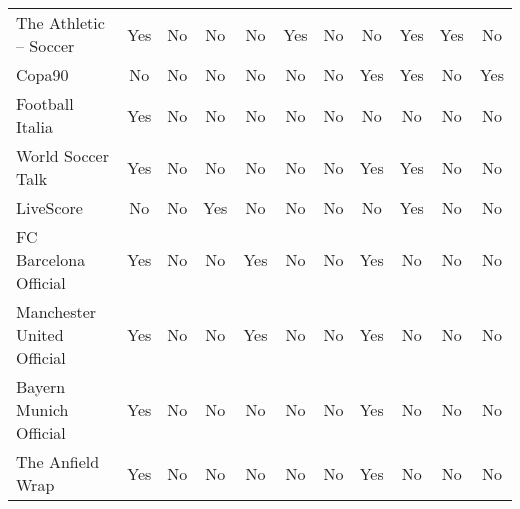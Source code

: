 \begin{table}[h!]
\begin{tabularx}{\textwidth}{|l|c|c|c|c|c|c|c|c|c|c|}
The Athletic – Soccer & Yes                    & No                  & No              & No                   & Yes                   & No                    & No                 & Yes                 & Yes                 & No                   \\
Copa90                & No                     & No                  & No              & No                   & No                    & No                    & Yes                & Yes                 & No                  & Yes                  \\
Football Italia       & Yes                    & No                  & No              & No                   & No                    & No                    & No                 & No                  & No                  & No                   \\
World Soccer Talk     & Yes                    & No                  & No              & No                   & No                    & No                    & Yes                & Yes                 & No                  & No                   \\
LiveScore             & No                     & No                  & Yes             & No                   & No                    & No                    & No                 & Yes                 & No                  & No                   \\
FC Barcelona Official & Yes                    & No                  & No              & Yes                  & No                    & No                    & Yes                & No                  & No                  & No                   \\
Manchester United Official & Yes               & No                  & No              & Yes                  & No                    & No                    & Yes                & No                  & No                  & No                   \\
Bayern Munich Official & Yes                   & No                  & No              & No                   & No                    & No                    & Yes                & No                  & No                  & No                   \\
The Anfield Wrap      & Yes                    & No                  & No              & No                   & No                    & No                    & Yes                & No                  & No                  & No                   \\

\end{tabularx}
\end{table}

